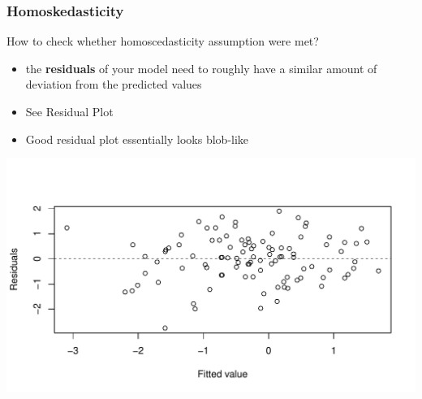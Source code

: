 \documentclass[10p]{beamer}\usepackage[]{graphicx}\usepackage[]{color}
\makeatletter
\def\maxwidth{ %
  \ifdim\Gin@nat@width>\linewidth
    \linewidth
  \else
    \Gin@nat@width
  \fi
}
\newenvironment{knitrout}{}{} %
\makeatother
\begin{document}
\begin{frame}
\frametitle{Homoskedasticity}
How to check whether homoscedasticity assumption were met?
\begin{itemize}
\item the \textbf{residuals} of your model need to roughly have a similar amount of deviation from the predicted values
\item See Residual Plot
\item Good residual plot essentially looks blob-like
\end{itemize}
\begin{knitrout}
\color{fgcolor}
\includegraphics[width=\maxwidth]{figure/unnamed-chunk-16-1} 

\end{knitrout}

\end{frame}
\end{document}
